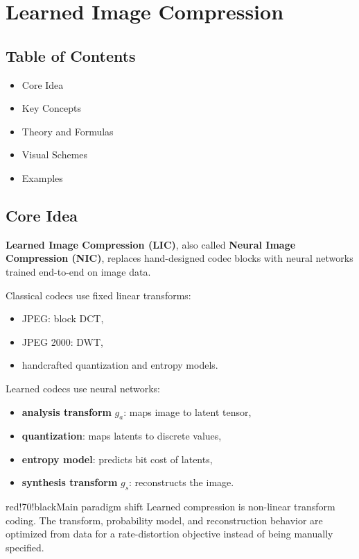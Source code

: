 \chapter{Learned Image Compression}

\section{Table of Contents}

\begin{itemize}
  \item Core Idea
  \item Key Concepts
  \item Theory and Formulas
  \item Visual Schemes
  \item Examples
\end{itemize}

\section{Core Idea}

\textbf{Learned Image Compression (LIC)}, also called \textbf{Neural Image Compression (NIC)}, replaces hand-designed codec blocks with neural networks trained end-to-end on image data.

Classical codecs use fixed linear transforms:

\begin{itemize}
  \item JPEG: block DCT,
  \item JPEG 2000: DWT,
  \item handcrafted quantization and entropy models.
\end{itemize}

Learned codecs use neural networks:

\begin{itemize}
  \item \textbf{analysis transform} $g_a$: maps image to latent tensor,
  \item \textbf{quantization}: maps latents to discrete values,
  \item \textbf{entropy model}: predicts bit cost of latents,
  \item \textbf{synthesis transform} $g_s$: reconstructs the image.
\end{itemize}

\begin{calloutbox}{red!70!black}{Main paradigm shift}
Learned compression is non-linear transform coding. The transform, probability model, and reconstruction behavior are optimized from data for a rate-distortion objective instead of being manually specified.
\end{calloutbox}

